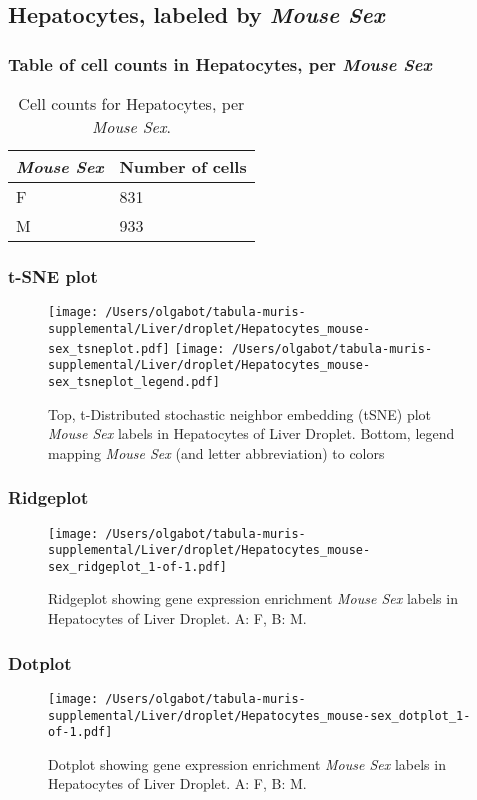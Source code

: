 \clearpage

\subsection{Hepatocytes, labeled by \emph{Mouse Sex}}
\subsubsection{Table of cell counts in Hepatocytes, per \emph{Mouse Sex}}\begin{table}[h]
\centering
\label{my-label}
\begin{tabular}{@{}ll@{}}
\toprule

\emph{Mouse Sex}& Number of cells \\ \midrule
F & 831 \\

M & 933 \\
\bottomrule
\end{tabular}
\caption{Cell counts for Hepatocytes, per \emph{Mouse Sex}.}
\end{table}

\clearpage
\subsubsection{t-SNE plot}
\begin{figure}[h]
\centering
\texttt{[image: /Users/olgabot/tabula-muris-supplemental/Liver/droplet/Hepatocytes\_mouse-sex\_tsneplot.pdf]}
\texttt{[image: /Users/olgabot/tabula-muris-supplemental/Liver/droplet/Hepatocytes\_mouse-sex\_tsneplot\_legend.pdf]}
\caption{Top, t-Distributed stochastic neighbor embedding (tSNE) plot  \emph{Mouse Sex} labels in Hepatocytes of Liver Droplet. Bottom, legend mapping \emph{Mouse Sex} (and letter abbreviation) to colors}
\end{figure}


\clearpage

\subsubsection{Ridgeplot}
\begin{figure}[h]
\centering
\texttt{[image: /Users/olgabot/tabula-muris-supplemental/Liver/droplet/Hepatocytes\_mouse-sex\_ridgeplot\_1-of-1.pdf]}

\caption{ Ridgeplot  showing gene expression enrichment \emph{Mouse Sex} labels in Hepatocytes of Liver Droplet. A: F, B: M.}
\end{figure}


\clearpage

\subsubsection{Dotplot}
\begin{figure}[h]
\centering
\texttt{[image: /Users/olgabot/tabula-muris-supplemental/Liver/droplet/Hepatocytes\_mouse-sex\_dotplot\_1-of-1.pdf]}

\caption{ Dotplot  showing gene expression enrichment \emph{Mouse Sex} labels in Hepatocytes of Liver Droplet. A: F, B: M.}
\end{figure}

